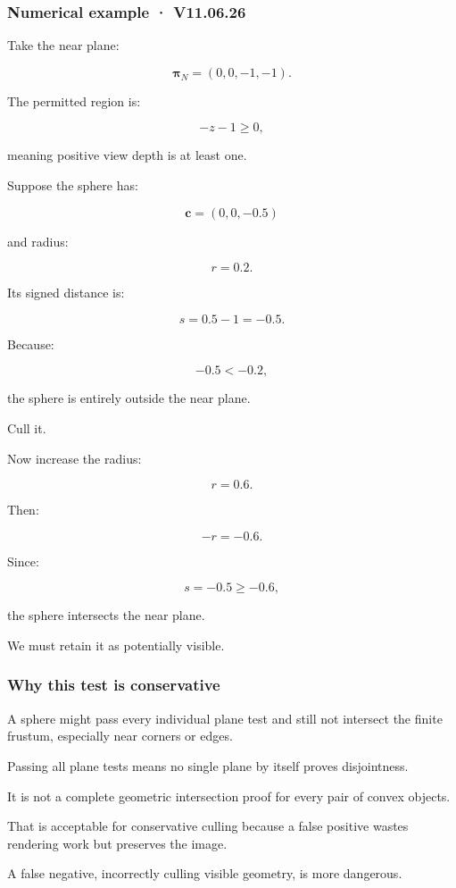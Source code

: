 \subsubsection{Numerical example · V11.06.26}\label{numerical-example-v11.06.26}

Take the near plane:

\[
 \boldsymbol\pi_N=(0,0,-1,-1).
\]

The permitted region is:

\[
 -z-1\ge0,
\]

meaning positive view depth is at least one.

Suppose the sphere has:

\[
 \mathbf c=(0,0,-0.5)
\]

and radius:

\[
 r=0.2.
\]

Its signed distance is:

\[
 s=0.5-1=-0.5.
\]

Because:

\[
 -0.5<-0.2,
\]

the sphere is entirely outside the near plane.

Cull it.

Now increase the radius:

\[
 r=0.6.
\]

Then:

\[
 -r=-0.6.
\]

Since:

\[
 s=-0.5\ge-0.6,
\]

the sphere intersects the near plane.

We must retain it as potentially visible.

\subsubsection{Why this test is conservative}\label{why-this-test-is-conservative}

A sphere might pass every individual plane test and still not intersect the finite frustum, especially near corners or edges.

Passing all plane tests means no single plane by itself proves disjointness.

It is not a complete geometric intersection proof for every pair of convex objects.

That is acceptable for conservative culling because a false positive wastes rendering work but preserves the image.

A false negative, incorrectly culling visible geometry, is more dangerous.

